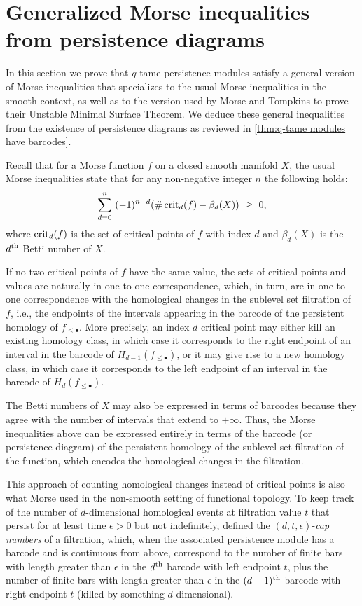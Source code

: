 
\section{Generalized Morse inequalities from persistence diagrams} \label{s:inequalities}

In this section we prove that $q$-tame persistence modules satisfy a general version of Morse inequalities that specializes to the usual Morse inequalities in the smooth context, as well as to the version used by Morse and Tompkins to prove their Unstable Minimal Surface Theorem.
We deduce these general inequalities from the existence of persistence diagrams as reviewed in \cref{thm:q-tame modules have barcodes}.

Recall that for a Morse function $f$ on a closed smooth manifold $X$, the usual Morse inequalities state that for any non-negative integer $n$ the following holds:
\begin{equation} \label{equ:morse_inequalities}
\sum_{d=0}^n \ (-1)^{n-d} ( \# \crit_{d}(f) - \beta_{d}(X) ) \ \geq\  0,  
\end{equation}
where $\operatorname{crit}_{d}(f)$ is the set of critical points of $f$ with index $d$ and $\beta_{d}(X)$ is the $d^{\mathrm{th}}$ Betti number of $X$.

If no two critical points of $f$ have the same value, the sets of critical points and values are naturally in one-to-one correspondence, which, in turn, are in one-to-one correspondence with the homological changes in the sublevel set filtration of $f$, i.e., the endpoints of the intervals appearing in the barcode of the persistent homology of $f_{\leq \bullet}$.
More precisely, an index $d$ critical point may either kill an existing homology class, in which case it corresponds to the right endpoint of an interval in the barcode of $H_{d-1}(f_{\leq \bullet})$, or it may give rise to a new homology class, in which case it corresponds to the left endpoint of an interval in the barcode of $H_d(f_{\leq \bullet})$.

The Betti numbers of $X$ may also be expressed in terms of barcodes because they agree with the number of intervals that extend to $+\infty$.
Thus, the Morse inequalities above can be expressed entirely in terms of the barcode (or persistence diagram) of the persistent homology of the sublevel set filtration of the function, which encodes the homological changes in the filtration.

This approach of counting homological changes instead of critical points is also what Morse used in the non-smooth setting of functional topology.
To keep track of the number of $d$-dimensional homological events at filtration value $t$ that persist for at least time $\epsilon > 0$ but not indefinitely, \citet{Morse.1940} defined the $(d, t, \epsilon)$-\textit{cap numbers} of a filtration, which, when the associated persistence module has a barcode and is continuous from above, correspond to the number of finite bars with length greater than $\epsilon$ in the $d^{\mathrm{th}}$ barcode with left endpoint $t$, plus the number of finite bars with length greater than $\epsilon$ in the $(d-1)^{\mathrm{th}}$ barcode with right endpoint $t$ (killed by something $d$-dimensional).


